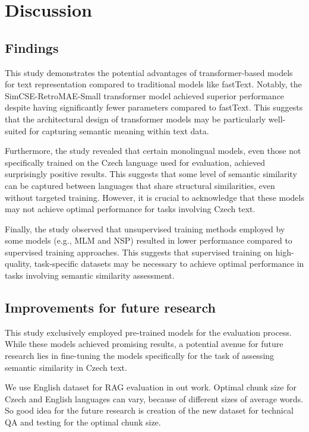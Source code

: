 
\chapter{Discussion\label{chap:discussion}}

\section{Findings}
This study demonstrates the potential advantages of transformer-based models for text representation compared to traditional models like fastText.
Notably, the SimCSE-RetroMAE-Small transformer model achieved superior performance despite having significantly fewer parameters compared to fastText.
This suggests that the architectural design of transformer models may be particularly well-suited for capturing semantic meaning within text data.

Furthermore, the study revealed that certain monolingual models, even those not specifically trained on the Czech language used for evaluation, achieved surprisingly positive results.
This suggests that some level of semantic similarity can be captured between languages that share structural similarities, even without targeted training.
However, it is crucial to acknowledge that these models may not achieve optimal performance for tasks involving Czech text.

Finally, the study observed that unsupervised training methods employed by some models (e.g., \ac{MLM} and \ac{NSP}) resulted in lower performance compared to supervised training approaches.
This suggests that supervised training on high-quality, task-specific datasets may be necessary to achieve optimal performance in tasks involving semantic similarity assessment.


\section{Improvements for future research}
This study exclusively employed pre-trained models for the evaluation process.
While these models achieved promising results, a potential avenue for future research lies in fine-tuning the models specifically for the task of assessing semantic similarity in Czech text.

We use English dataset for \ac{RAG}  evaluation in out work.
Optimal chunk size for Czech and English languages can vary, because of different sizes of average words. 
So good idea for the future research is creation of the new dataset for technical \ac{QA} and testing for the optimal chunk size.

